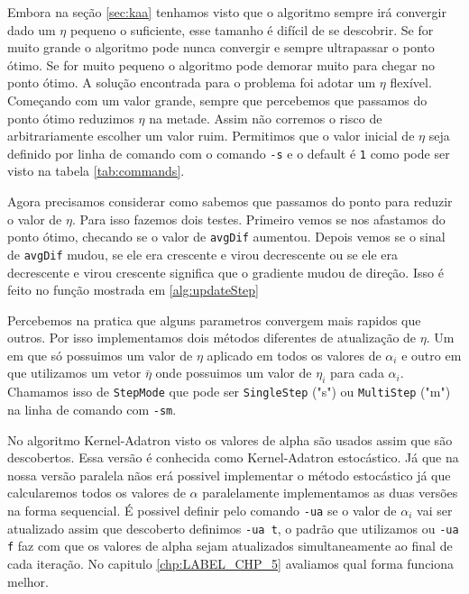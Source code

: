 Embora na seção \ref{sec:kaa} tenhamos visto que o algoritmo sempre irá convergir dado um $\eta$ pequeno o suficiente, esse tamanho é difícil de se descobrir. Se for muito grande o algoritmo pode nunca convergir e sempre ultrapassar o ponto ótimo. Se for muito pequeno o algoritmo pode demorar muito para chegar no ponto ótimo. A solução encontrada para o problema foi adotar um $\eta$ flexível. Começando com um valor grande, sempre que percebemos que passamos do ponto ótimo reduzimos $\eta$ na metade. Assim não corremos o risco de arbitrariamente escolher um valor ruim. Permitimos que o valor inicial de $\eta$ seja definido por linha de comando com o comando \texttt{-s} e o default é \texttt{1} como pode ser visto na tabela \ref{tab:commands}.

Agora precisamos considerar como sabemos que passamos do ponto para reduzir o valor de $\eta$. Para isso fazemos dois testes. Primeiro vemos se nos afastamos do ponto ótimo, checando se o valor de \texttt{avgDif} aumentou. Depois vemos se o sinal de \texttt{avgDif} mudou, se ele era crescente e virou decrescente ou se ele era decrescente e virou crescente significa que o gradiente mudou de direção. Isso é feito no função mostrada em  \ref{alg:updateStep}


Percebemos na pratica que alguns parametros convergem mais rapidos que outros. Por isso implementamos dois métodos diferentes de atualização de $\eta$. Um em que só possuimos um valor de $\eta$ aplicado em todos os valores de $\alpha_i$ e outro em que utilizamos um vetor $\bar{\eta}$ onde possuimos um valor de $\eta_i$ para cada $\alpha_i$. Chamamos isso de \texttt{StepMode} que pode ser \texttt{SingleStep} ("s") ou \texttt{MultiStep} ("m") na linha de comando com \texttt{-sm}.

No algoritmo Kernel-Adatron visto os valores de alpha são usados assim que são descobertos. Essa versão é conhecida como Kernel-Adatron estocástico. Já que na nossa versão paralela nãos erá possivel implementar o método estocástico já que calcularemos todos os valores de $\alpha$ paralelamente implementamos as duas versões na forma sequencial. É possivel definir pelo comando \texttt{-ua} se o valor de $\alpha_i$ vai ser atualizado assim que descoberto definimos \texttt{-ua t}, o padrão que utilizamos ou \texttt{-ua f} faz com que os valores de alpha sejam atualizados simultaneamente ao final de cada iteração. No capitulo \ref{chp:LABEL_CHP_5} avaliamos qual forma funciona melhor.

